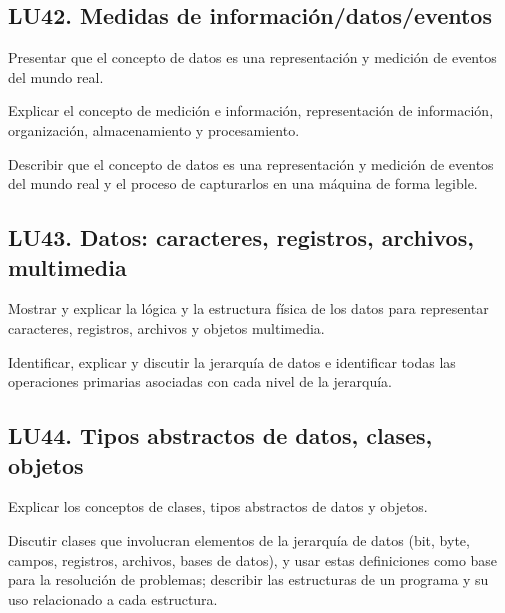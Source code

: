\subsection{LU42. Medidas de información/datos/eventos}\label{sec:LU42}
\begin{LearningUnit}
\begin{LUGoal}
\item Presentar que el concepto de datos es una representación y medición de eventos del mundo real.
\end{LUGoal}

\begin{LUObjective}
\item Explicar el concepto de medición e información, representación de información, organización, almacenamiento y procesamiento.
\item Describir que el concepto de datos es una representación y medición de eventos del mundo real y el proceso de capturarlos en una máquina de forma legible.
\end{LUObjective}
\end{LearningUnit}

\subsection{LU43. Datos: caracteres, registros, archivos, multimedia}\label{sec:LU43}
\begin{LearningUnit}
\begin{LUGoal}
\item Mostrar y explicar la lógica y la estructura física de los datos para representar caracteres, registros, archivos y objetos multimedia.
\end{LUGoal}

\begin{LUObjective}
\item Identificar, explicar y discutir la jerarquía de datos e identificar todas las operaciones primarias asociadas con cada nivel de la jerarquía.
\end{LUObjective}
\end{LearningUnit}

\subsection{LU44. Tipos abstractos de datos, clases, objetos}\label{sec:LU44}
\begin{LearningUnit}
\begin{LUGoal}
\item Explicar los conceptos de clases, tipos abstractos de datos y objetos.
\end{LUGoal}

\begin{LUObjective}
\item Discutir clases que involucran elementos de la jerarquía de datos (bit, byte, campos, registros, archivos, bases de datos), y usar estas definiciones como base para la resolución de problemas; describir las estructuras de un programa y su uso relacionado a cada estructura.
\end{LUObjective}
\end{LearningUnit}

